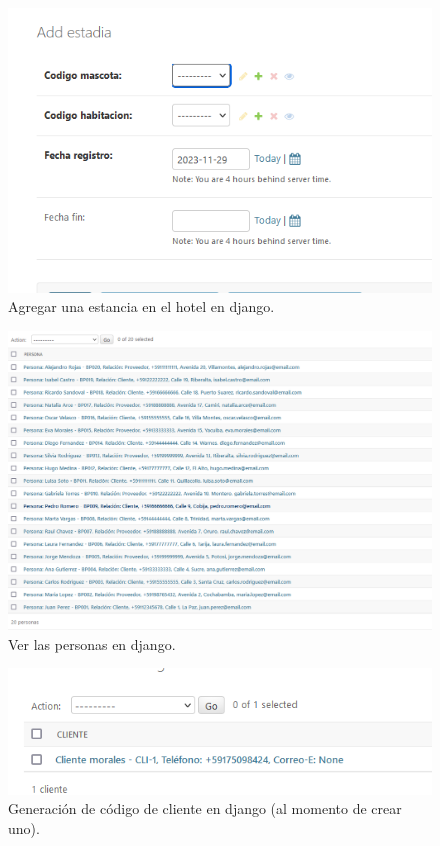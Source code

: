 \documentclass[
  12pt,
  hidelinks,
  a4paper,
  headings=standardclasses,
  headings=big,
  spanish
]{scrartcl}
\begin{document}
\begin{figure}[H]
  \centering
  \includegraphics[width=\textwidth]{django-estadia-add.png}
  \caption{Agregar una estancia en el hotel en django.}
\end{figure}

\begin{figure}[H]
  \centering
  \includegraphics[width=\textwidth]{django-persona-read.png}
  \caption{Ver las personas en django.}
\end{figure}

\begin{figure}[H]
  \centering
  \includegraphics[width=\textwidth]{django-cliente-create.png}
  \caption{Generación de código de cliente en django (al momento de crear uno).}
\end{figure}
\end{document}
